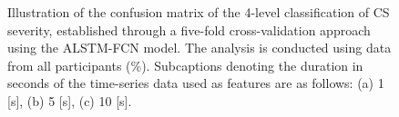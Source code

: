\documentclass{ieeeaccess}
\begin{document}
\begin{figure}[htbp!]
    \centering
    \hfill
    \hfill
    \caption{Illustration of the confusion matrix of the 4-level classification of CS severity, established through a five-fold cross-validation approach using the ALSTM-FCN model. The analysis is conducted using data from all participants (\%). Subcaptions denoting the duration in seconds of the time-series data used as features are as follows: (a) 1 [s], (b) 5 [s], (c) 10 [s].}
    \label{fig:ALSTM-FCN}
\end{figure}
\end{document}
